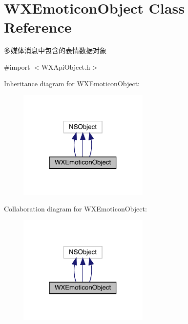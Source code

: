 \hypertarget{interface_w_x_emoticon_object}{}\section{W\+X\+Emoticon\+Object Class Reference}
\label{interface_w_x_emoticon_object}


多媒体消息中包含的表情数据对象  




{\ttfamily \#import $<$W\+X\+Api\+Object.\+h$>$}



Inheritance diagram for W\+X\+Emoticon\+Object\+:\nopagebreak
\begin{figure}[H]
\begin{center}
\leavevmode
\includegraphics[width=183pt]{interface_w_x_emoticon_object__inherit__graph}
\end{center}
\end{figure}


Collaboration diagram for W\+X\+Emoticon\+Object\+:\nopagebreak
\begin{figure}[H]
\begin{center}
\leavevmode
\includegraphics[width=183pt]{interface_w_x_emoticon_object__coll__graph}
\end{center}
\end{figure}
